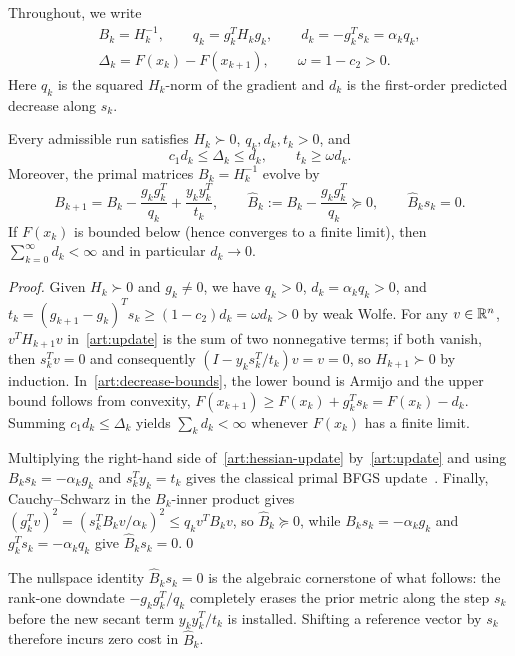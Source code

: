 Throughout, we write
\[
 \begin{gathered}
 B_k=H_k^{-1},\qquad q_k=g_k^TH_kg_k,\qquad
 d_k=-g_k^Ts_k=\alpha_kq_k,\\
 \Delta_k=F(x_k)-F(x_{k+1}),\qquad \omega=1-c_2>0.
 \end{gathered}
\]
Here $q_k$ is the squared $H_k$-norm of the gradient and $d_k$ is the
first-order predicted decrease along $s_k$.

\begin{lemma}\label{art:run-invariants}
Every admissible run satisfies $H_k\succ0$, $q_k,d_k,t_k>0$, and
\begin{equation}\label{art:decrease-bounds}
 c_1d_k\le\Delta_k\le d_k,\qquad t_k\ge\omega d_k.
\end{equation}
Moreover, the primal matrices $B_k=H_k^{-1}$ evolve by
\begin{equation}\label{art:hessian-update}
 B_{k+1}=B_k-\frac{g_kg_k^T}{q_k}+\frac{y_ky_k^T}{t_k},
 \qquad \widehat B_k:=B_k-\frac{g_kg_k^T}{q_k}\succeq0,
 \qquad \widehat B_ks_k=0.
\end{equation}
If $F(x_k)$ is bounded below (hence converges to a finite limit), then
$\sum_{k=0}^\infty d_k<\infty$ and in particular $d_k\to0$.
\end{lemma}
\begin{proof}
Given $H_k\succ0$ and $g_k\ne0$, we have $q_k>0$, $d_k=\alpha_kq_k>0$, and
$t_k=(g_{k+1}-g_k)^Ts_k\ge(1-c_2)d_k=\omega d_k>0$ by weak Wolfe. For any
$v\in\mathbb R^n$, $v^TH_{k+1}v$ in~\eqref{art:update} is the sum of two nonnegative
terms; if both vanish, then $s_k^Tv=0$ and consequently $(I-y_ks_k^T/t_k)v=v=0$,
so $H_{k+1}\succ0$ by induction. In~\eqref{art:decrease-bounds}, the lower bound
is Armijo and the upper bound follows from convexity,
$F(x_{k+1})\ge F(x_k)+g_k^Ts_k=F(x_k)-d_k$. Summing $c_1d_k\le\Delta_k$ yields
$\sum_kd_k<\infty$ whenever $F(x_k)$ has a finite limit.

Multiplying the right-hand side of~\eqref{art:hessian-update} by~\eqref{art:update}
and using $B_ks_k=-\alpha_kg_k$ and $s_k^Ty_k=t_k$ gives the classical primal
BFGS update~\cite[Section~5]{FND_N92}. Finally, Cauchy--Schwarz in the
$B_k$-inner product gives $(g_k^Tv)^2=(s_k^TB_kv/\alpha_k)^2\le q_kv^TB_kv$, so
$\widehat B_k\succeq0$, while $B_ks_k=-\alpha_kg_k$ and $g_k^Ts_k=-\alpha_kq_k$
give $\widehat B_ks_k=0$.\qed
\end{proof}

The nullspace identity $\widehat B_ks_k=0$ is the algebraic cornerstone of what
follows: the rank-one downdate $-g_kg_k^T/q_k$ completely erases the prior
metric along the step $s_k$ before the new secant term $y_ky_k^T/t_k$ is
installed. Shifting a reference vector by $s_k$ therefore incurs zero cost in
$\widehat B_k$.


